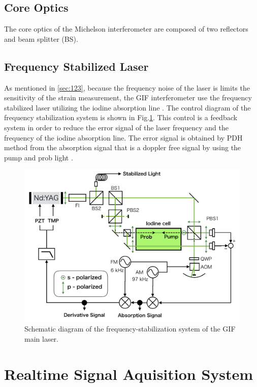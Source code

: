 \subsection{Core Optics}
The core optics of the Michelson interferometer are composed of two reflectors and beam splitter (BS). 


\subsection{Frequency Stabilized Laser} \label{sec:sec135}
As mentioned in \cref{sec:123}, because the frequency noise of the laser is limits the sensitivity of the strain measurement, the GIF interferometer use the frequency stabilized laser utilizing the iodine absorption line \cite{araya2002iodine}. The control diagram of the frequency stabilization system is shown in Fig.\ref{img:img417}. This control is a feedback system in order to reduce the error signal of the laser frequency and the frequency of the iodine absorption line. The error signal is obtained by PDH method from the absorption signal that is a doppler free signal by using the pump and prob light \cite{snyder1980high}.
\begin{figure}[h]
  \begin{center}   
    \includegraphics[width=12cm]{./img_chap4/img417.png}
    \caption{Schematic diagram of the frequency-stabilization system of the GIF main laser.}\label{img:img417}
  \end{center}
\end{figure}







\section{Realtime Signal  Aquisition System} \label{sec:sec44}

